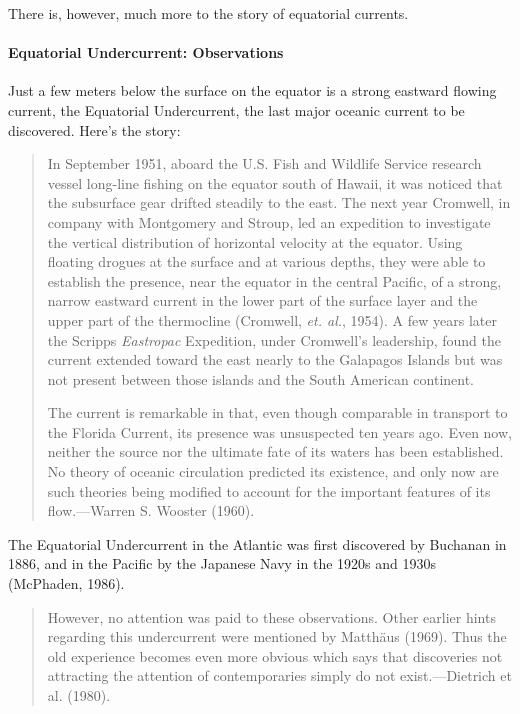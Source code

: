 There is, however, much more to the story of equatorial currents.

\paragraph{Equatorial Undercurrent: Observations}
Just a few meters below the
surface on the equator is a strong eastward flowing current, the
Equatorial Undercurrent, the last major oceanic current to be
discovered. Here's the story:
\begin{quotation} \small
In September 1951, aboard the U.S. Fish and Wildlife Service research
vessel long-line fishing on the equator south of Hawaii, it was
noticed that the subsurface gear drifted steadily to the east. The
next year Cromwell, in company with Montgomery and Stroup, led an
expedition to investigate the vertical distribution of horizontal
velocity at the equator. Using floating drogues at the surface and at
various depths, they were able to establish the presence, near the
equator in the central Pacific, of a strong, narrow eastward current
in the lower part of the surface layer and the upper part of the
thermocline (Cromwell, \textit{et. al.},
1954). A few years later the Scripps \textit{Eastropac} Expedition,
under Cromwell's leadership, found the current extended toward the
east nearly to the Galapagos Islands but was not present between those
islands and the South American continent.

The current is remarkable in that, even though comparable in
transport to the Florida
Current, its presence was unsuspected ten years ago.  Even now,
neither the source nor the ultimate fate of its waters has been
established. No theory of oceanic circulation predicted its existence,
and only now are such theories being modified to account for the
important features of its flow.---Warren S.  Wooster (1960).
\end{quotation}

The Equatorial Undercurrent in the Atlantic was first discovered by
Buchanan in 1886, and in the Pacific by the Japanese Navy in the 1920s
and 1930s (McPhaden, 1986).
\begin{quote} \small
However, no attention was paid to these observations. Other earlier
hints regarding this undercurrent were mentioned by Matth\"{a}us
(1969). Thus the old experience becomes even more obvious which says
that discoveries not attracting the attention of contemporaries simply
do not exist.---Dietrich et al. (1980).
\end{quote}

